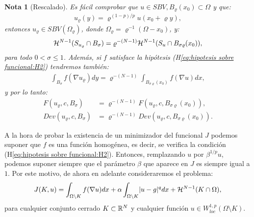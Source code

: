 \documentclass[a4paper,11pt,spanish, twoside, leqno]{tfm-uam}
\newtheorem{nota}[teo]{Nota}
\begin{document}
\begin{nota}[Rescalado]
Es fácil comprobar que $u\in SBV, B_{\varrho}(x_{0})\subset \Omega$ y que:
\begin{align*}
u_{\varrho}(y)=\varrho^{(1-p)/p}u(x_{0}+\varrho y),
\end{align*}
entonces $u_{\varrho}\in SBV(\Omega_{\varrho})$, donde $\Omega_{\varrho}=\varrho^{-1}(\Omega -x_{0})$, y:
\begin{align*}
\mathcal{H}^{N-1}(S_{u_{\varrho}}\cap B_{\sigma})=\varrho^{-(N-1)}\mathcal{H}^{N-1}(S_{u}\cap B_{\sigma\varrho}(x_{0})),
\end{align*}
para todo $0<\sigma\leq 1$. Además, si $f$ satisface la hipótesis (H\ref{eq:hipotesis sobre funcional:H2}) tendremos también:
\begin{align*}
\int_{B_{\sigma}}f(\nabla{u_{\varrho}})dy=\varrho^{-(N-1)}\int_{B_{\sigma\varrho}(x_{0})}f(\nabla{u})dx,
\end{align*}
y por lo tanto:
\begin{align*}
F(u_{\varrho},c,B_{\sigma})&=\varrho^{-(N-1)}F(u_{\varrho},c,B_{\sigma\varrho}(x_{0})),\\
Dev(u_{\varrho},c,B_{\sigma})&=\varrho^{-(N-1)}Dev(u_{\varrho},c,B_{\sigma\varrho}(x_{0})).
\end{align*}
\end{nota}

A la hora de probar la existencia de un minimizador del funcional $J$ podemos suponer que $f$ es una función homogénea, es decir, se verifica la condición (H\ref{eq:hipotesis sobre funcional:H2}). Entonces, remplazando $u$ por $\beta^{1/p}u$, podemos suponer siempre que el parámetro $\beta$ que aparece en $J$ es siempre igual a $1$. Por este motivo, de ahora en adelante consideraremos el problema:
\begin{align*}
J(K,u)=\int_{\Omega\setminus K}f(\nabla u) dx + \alpha \int_{\Omega\setminus K}\lvert u-g\rvert^{q}dx+\mathcal{H}^{N-1}(K\cap \Omega),
\end{align*}
para cualquier conjunto cerrado $K\subset \mathbb{R}^{N}$ y cualquier función $u\in W_{loc}^{1,p}(\Omega\setminus K)$.
\end{document}
